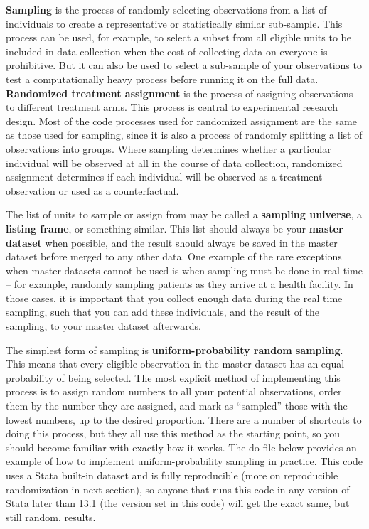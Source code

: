 \textbf{Sampling} is the process of randomly selecting observations
from a list of individuals to create a representative or statistically similar sub-sample.
This process can be used, for example, to select a subset from all eligible units
to be included in data collection when the cost of collecting data on everyone is prohibitive.
But it can also be used to select a sub-sample of your observations to test a computationally heavy process 
before running it on the full data.
\textbf{Randomized treatment assignment} is the process of assigning observations to different treatment arms.
This process is central to experimental research design.
Most of the code processes used for randomized assignment are the same as those used for sampling,
since it is also a process of randomly splitting a list of observations into groups.
Where sampling determines whether a particular individual
will be observed at all in the course of data collection,
randomized assignment determines if each individual will be observed
as a treatment observation or used as a counterfactual.

The list of units to sample or assign from may be called a \textbf{sampling universe},
a \textbf{listing frame}, or something similar.
This list should always be your \textbf{master dataset} when possible,
and the result should always be saved in the master dataset
before merged to any other data.
One example of the rare exceptions 
when master datasets cannot be used is 
when sampling must be done in real time --
for example, randomly sampling patients 
as they arrive at a health facility.
In those cases, 
it is important that you collect enough data
during the real time sampling,
such that you can add these individuals, 
and the result of the sampling, 
to your master dataset afterwards.

The simplest form of sampling is 
\textbf{uniform-probability random sampling}.
This means that every eligible observation in the master dataset
has an equal probability of being selected.
The most explicit method of implementing this process
is to assign random numbers to all your potential observations,
order them by the number they are assigned,
and mark as ``sampled'' those with the lowest numbers, up to the desired proportion.
There are a number of shortcuts to doing this process,
but they all use this method as the starting point,
so you should become familiar with exactly how it works.
The do-file below provides an example of
how to implement uniform-probability sampling in practice.
This code uses a Stata built-in dataset and is fully reproducible
(more on reproducible randomization in next section),
so anyone that runs this code in any version of Stata later than 13.1
(the version set in this code)
will get the exact same, but still random, results.

